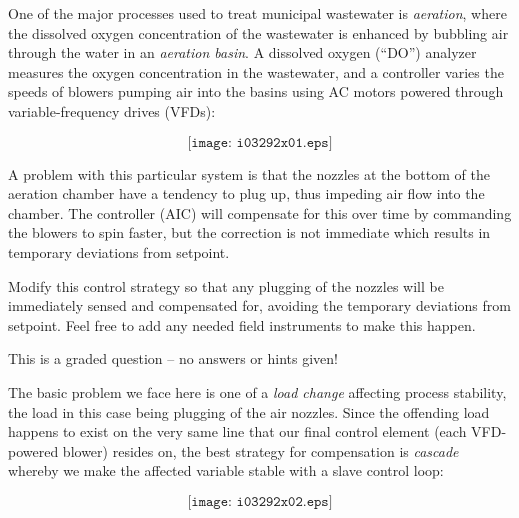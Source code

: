 

One of the major processes used to treat municipal wastewater is {\it aeration}, where the dissolved oxygen concentration of the wastewater is enhanced by bubbling air through the water in an {\it aeration basin}.  A dissolved oxygen (``DO'') analyzer measures the oxygen concentration in the wastewater, and a controller varies the speeds of blowers pumping air into the basins using AC motors powered through variable-frequency drives (VFDs):

$$\texttt{[image: i03292x01.eps]}$$

A problem with this particular system is that the nozzles at the bottom of the aeration chamber have a tendency to plug up, thus impeding air flow into the chamber.  The controller (AIC) will compensate for this over time by commanding the blowers to spin faster, but the correction is not immediate which results in temporary deviations from setpoint. 

\vskip 10pt

Modify this control strategy so that any plugging of the nozzles will be immediately sensed and compensated for, avoiding the temporary deviations from setpoint.  Feel free to add any needed field instruments to make this happen.

\vfil 

\eject






This is a graded question -- no answers or hints given!







The basic problem we face here is one of a {\it load change} affecting process stability, the load in this case being plugging of the air nozzles.  Since the offending load happens to exist on the very same line that our final control element (each VFD-powered blower) resides on, the best strategy for compensation is {\it cascade} whereby we make the affected variable stable with a slave control loop:

$$\texttt{[image: i03292x02.eps]}$$

